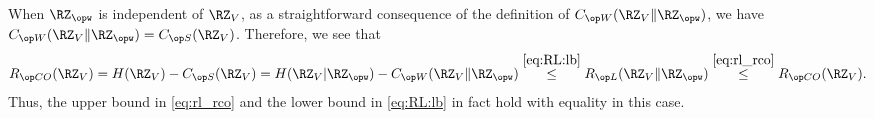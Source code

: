 When $\RZ_{\opw}$ is independent of $\RZ_V$, as a straightforward consequence of the definition of $\wskc(\RZ_V\|\RZ_{\opw})$, we have $\wskc(\RZ_V\|\RZ_{\opw})=\skc(\RZ_V)$. Therefore, we see that $$\rco(\RZ_V) = H(\RZ_V)-\skc(\RZ_V)=H(\RZ_V|\RZ_{\opw}) - \wskc(\RZ_V\|\RZ_{\opw}) \stackrel{\eqref{eq:RL:lb}}{\leq} \rl(\RZ_V\|\RZ_{\opw}) \stackrel{\eqref{eq:rl_rco}}{\le} \rco(\RZ_V).$$ Thus, the upper bound in \eqref{eq:rl_rco} and the lower bound in \eqref{eq:RL:lb} in fact hold with equality in this case.
